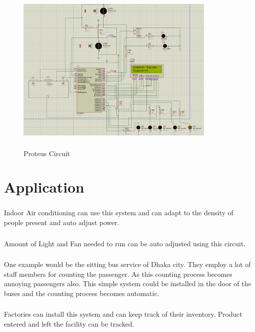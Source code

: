 \documentclass[conference]{IEEEtran}
\begin{document}
\begin{figure}[H]
  \includegraphics[width=9.7cm, height=8.2cm]{circuit.png}
  \caption{Proteus Circuit}
\centering
  \label{fig:circuit}
\end{figure}





\section{Application}

\subsubsection{}
Indoor Air conditioning can use this system and can adapt to the density of people present and auto adjust power.
\subsubsection{}
Amount of Light and Fan needed to run can be auto adjusted using this circuit.
\subsubsection{}
One example would be the sitting bus service of Dhaka city. They employ a lot of staff members  for counting the passenger. As this counting process becomes annoying passengers also. This simple system could be installed in the door of the buses and the counting process becomes automatic.
\subsubsection{}Factories can install this system and can keep track of their inventory. Product entered and left the facility can be tracked.
\end{document}
